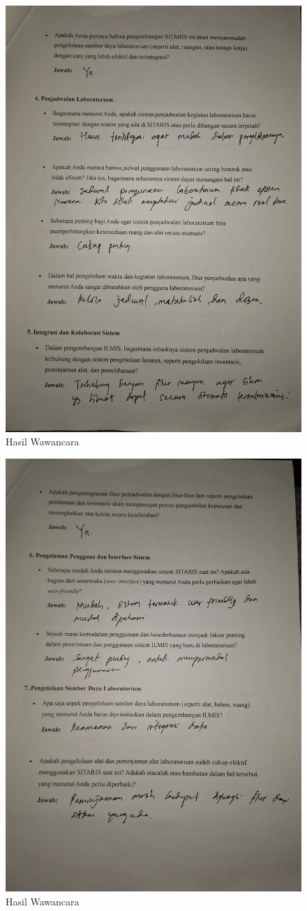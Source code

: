 \begin{figure}[h]
	\centering
	\includegraphics[width=0.82\linewidth]{konten/gambar/wawancara/3.jpg}
	\caption{Hasil Wawancara}
	\label{fig:hasil-wawancara}
\end{figure}
\begin{figure}[h]
	\centering
	\includegraphics[width=0.82\linewidth]{konten/gambar/wawancara/4.jpg}
	\caption{Hasil Wawancara}
	\label{fig:hasil-wawancara}
\end{figure}
